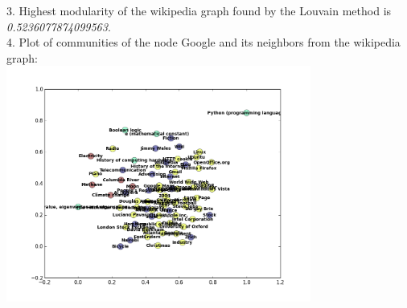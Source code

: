 \documentclass[11pt]{article} %
\begin{document}
3. Highest modularity of the wikipedia graph found by the Louvain method is \emph{0.5236077874099563}.\\

4. Plot of communities of the node Google and its neighbors from the wikipedia graph:\\
\includegraphics[width=10cm]{google_nei}\\

\end{document}
